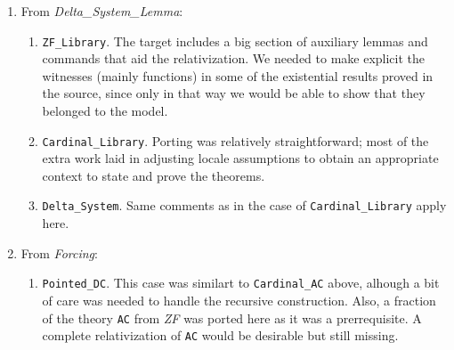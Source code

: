 \documentclass[11pt,a4paper]{article}
\newcommand{\session}[1]{\textit{#1}}
\newcommand{\theory}[1]{\texttt{#1}}
\begin{document}
\begin{enumerate}
\begin{enumerate}
  \end{enumerate}
\item From \session{Delta\_System\_Lemma}:
  \begin{enumerate}
  \item \theory{ZF\_Library}. The target includes a big section of
    auxiliary lemmas and commands that aid the relativization. We
    needed to make explicit the witnesses (mainly functions) in some of the
    existential results proved in the source, since only in that way
    we would be able to show that they belonged to the model.
  \item \theory{Cardinal\_Library}. Porting was relatively
    straightforward; most of the extra work laid in adjusting locale
    assumptions to obtain an appropriate context to state and prove
    the theorems.
  \item \theory{Delta\_System}. Same comments as in the case of
    \theory{Cardinal\_Library} apply here.
  \end{enumerate}
\item From \session{Forcing}:
  \begin{enumerate}
  \item \theory{Pointed\_DC}. This case was similart to
    \theory{Cardinal\_AC} above, alhough a bit of care was needed to
    handle the recursive construction. Also, a fraction of the theory
    \theory{AC} from \session{ZF} was ported here as it was a
    prerrequisite. A complete relativization of \theory{AC} would be
    desirable but still missing.
  \end{enumerate}
\end{enumerate}





\end{document}
